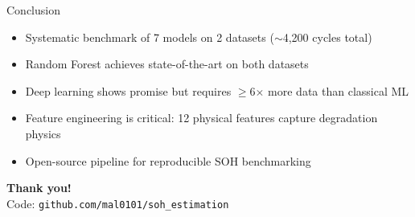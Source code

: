 \documentclass[aspectratio=169,11pt]{beamer}
\begin{document}
\begin{frame}{Conclusion}
\begin{itemize}[nosep]
    \item Systematic benchmark of 7 models on 2 datasets ($\sim$4,200 cycles total)
    \item Random Forest achieves state-of-the-art on both datasets
    \item Deep learning shows promise but requires $\geq$6$\times$ more data than classical ML
    \item Feature engineering is critical: 12 physical features capture degradation physics
    \item Open-source pipeline for reproducible SOH benchmarking
\end{itemize}
\vspace{1em}
\begin{center}
\textbf{Thank you!}\\
\vspace{0.5em}
\small Code: \texttt{github.com/mal0101/soh\_estimation}
\end{center}
\end{frame}
\end{document}
